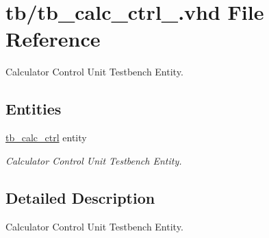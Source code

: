 \hypertarget{tb__calc__ctrl___8vhd}{}\section{tb/tb\+\_\+calc\+\_\+ctrl\+\_\+.vhd File Reference}
\label{tb__calc__ctrl___8vhd}


Calculator Control Unit Testbench Entity.  


\subsection*{Entities}
\begin{DoxyCompactItemize}
\item 
\hyperlink{classtb__calc__ctrl}{tb\+\_\+calc\+\_\+ctrl} entity
\begin{DoxyCompactList}\small\item\em Calculator Control Unit Testbench Entity. \end{DoxyCompactList}\end{DoxyCompactItemize}


\subsection{Detailed Description}
Calculator Control Unit Testbench Entity. 

